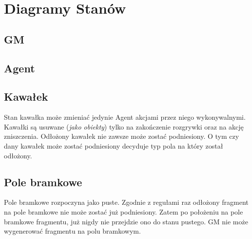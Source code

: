 \documentclass[../Dokumentacja.tex]{subfiles}
\begin{document}
\section{Diagramy Stanów}
\subsection{GM}
\subsection{Agent}
\subsection{Kawałek}
Stan kawałka może zmieniać jedynie Agent akcjami przez niego wykonywalnymi. Kawałki są usuwane (\textit{jako obiekty}) tylko na
zakończenie rozgrywki oraz na akcję zniszczenia. Odłożony kawałek nie zawsze może zostać podniesiony. O tym czy dany kawałek może
zostać podniesiony decyduje typ pola na który został odłożony.
\subsection{Pole bramkowe}
Pole bramkowe rozpoczyna jako puste. Zgodnie z regułami raz odłożony fragment na pole bramkowe nie może zostać już podniesiony. Zatem
po położeniu na pole bramkowe fragmentu, już nigdy nie przejdzie ono do stanu pustego. GM nie może wygenerować fragmentu na polu bramkowym.
\end{document}
